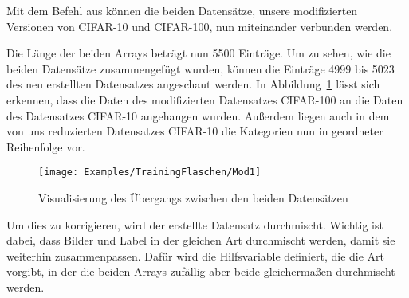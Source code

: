 

\medskip









\medskip
 
 Mit dem Befehl  aus  können die beiden Datensätze, unsere modifizierten Versionen von CIFAR-10 und CIFAR-100, nun miteinander verbunden werden.
 
\medskip



\medskip

Die Länge der beiden Arrays beträgt nun 5500 Einträge. Um zu sehen, wie die beiden Datensätze zusammengefügt wurden, können die Einträge 4999 bis 5023 des neu erstellten Datensatzes angeschaut werden. In Abbildung~\ref{Mod1} lässt sich erkennen, dass die Daten des modifizierten Datensatzes CIFAR-100  an die Daten des Datensatzes CIFAR-10 angehangen wurden. Außerdem liegen auch in dem von uns reduzierten Datensatzes  CIFAR-10 die Kategorien nun in geordneter Reihenfolge vor.
  
 \begin{figure}[H]
	\begin{center}
		\texttt{[image: Examples/TrainingFlaschen/Mod1]}
		\caption{Visualisierung des Übergangs zwischen den beiden Datensätzen} 
		\label{Mod1}
	\end{center}
\end{figure}  

Um dies zu korrigieren, wird der erstellte Datensatz durchmischt. Wichtig ist dabei, dass Bilder und Label in der gleichen Art durchmischt werden, damit sie weiterhin zusammenpassen. Dafür wird die Hilfsvariable  definiert, die die Art vorgibt, in der die beiden Arrays zufällig aber beide gleichermaßen durchmischt werden.

